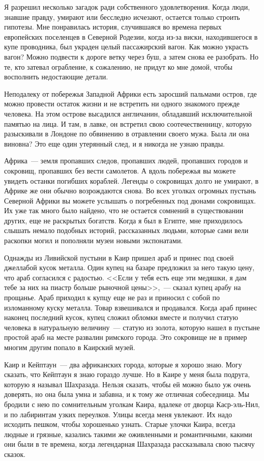 \documentclass[12pt,a4paper,twoside,openany,svgnames]{memoir}
\begin{document}
Я разрешил несколько загадок ради собственного удовлетворения. Когда люди, знавшие правду, умирают или бесследно исчезают, остается только строить гипотезы. Мне понравилась история, случившаяся во времена первых европейских поселенцев в Северной Родезии, когда из-за виски, находившегося в купе проводника, был украден целый пассажирский вагон. Как можно украсть вагон? Можно подвести к дороге ветку через буш, а затем снова ее разобрать. Но те, кто затевал ограбление, к сожалению, не придут ко мне домой, чтобы восполнить недостающие детали.

Неподалеку от побережья Западной Африки есть заросший пальмами остров, где можно провести остаток жизни и не встретить ни одного знакомого прежде человека. На этом острове высадился англичанин, обладавший исключительной памятью на лица. И там, в лавке, он встретил свою соотечественницу, которую разыскивали в Лондоне по обвинению в отравлении своего мужа. Была ли она виновна? Это еще один утерянный след, и я никогда не узнаю правды.

Африка~--- земля пропавших следов, пропавших людей, пропавших городов и сокровищ, пропавших без вести самолетов. А вдоль побережья вы можете увидеть останки погибших кораблей. Легенды о сокровищах долго не умирают, в Африке же они обычно возрождаются снова. Во всех уголках огромных пустынь Северной Африки вы можете услышать о погребенных под дюнами сокровищах. Их уже так много было найдено, что не остается сомнений в существовании других, еще не раскрытых богатств. Когда я был в Египте, мне приходилось слышать немало подобных историй, рассказанных людьми, которые сами вели раскопки могил и пополняли музеи новыми экспонатами.

Однажды из Ливийской пустыни в Каир пришел араб и принес под своей джеллабой кусок металла. Один купец на базаре предложил за него такую цену, что араб согласился с радостью. <<Если у тебя есть еще эти медяшки, я дам тебе за них на пиастр больше рыночной цены>>,~--- сказал купец арабу на прощанье. Араб приходил к купцу еще не раз и приносил с собой по изломанному куску металла. Товар взвешивался и продавался. Когда араб принес наконец последний кусок, купец сложил обломки вместе и получил статую человека в натуральную величину~--- статую из золота, которую нашел в пустыне простой араб на месте развалин римского города. Это сокровище не в пример многим другим попало в Каирский музей.

Каир и Кейптаун~--- два африканских города, которые я хорошо знаю. Могу сказать, что Кейптаун я знаю гораздо лучше. Но в Каире у меня была подруга, которую я называл Шахразада. Нельзя сказать, чтобы ей можно было уж очень доверять, но она была умна и забавна, и к тому же отличная собеседница. Мы бродили с нею по сомнительным уголкам Каира, вдалеке от дворца Каср-эль-Нил, и по лабиринтам узких переулков. Улицы всегда меня увлекают. Их надо исходить пешком, чтобы хорошенько узнать. Старые улочки Каира, всегда людные и грязные, казались такими же оживленными и романтичными, какими они были в те времена, когда легендарная Шахразада рассказывала свою тысячу сказок.
\end{document}
